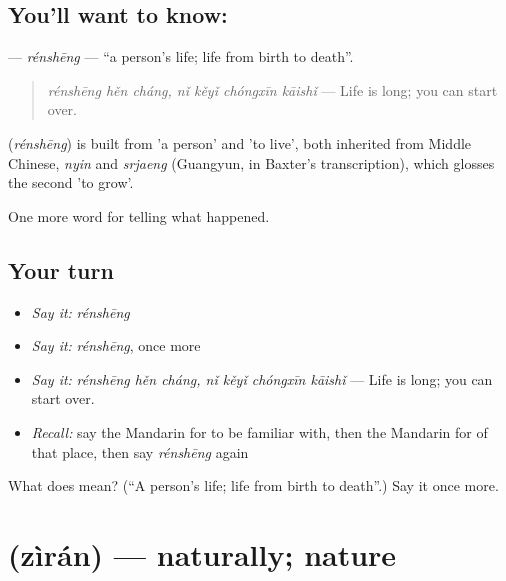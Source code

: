\subsection*{You'll want to know: }
\textbf{} — \emph{rénshēng} — \textquotedblleft{}a person's life; life from birth to death\textquotedblright{}.

\begin{quote}
\emph{rénshēng hěn cháng, nǐ kěyǐ chóngxīn kāishǐ} — Life is long; you can start over.
\end{quote}

\begin{cousinweb}
\textbf{} (\emph{rénshēng}) is built from  'a person' and  'to live', both inherited from Middle Chinese, \emph{nyin} and \emph{srjaeng} (Guangyun, in Baxter's transcription), which glosses the second 'to grow'.
\end{cousinweb}

\begin{grammarlens}[title={What you've built}]
One more word for telling what happened.
\end{grammarlens}

\subsection*{Your turn}
\begin{itemize}
\raggedright
  \item \emph{Say it:} \emph{rénshēng}
  \item \emph{Say it:} \emph{rénshēng}, once more
  \item \emph{Say it:} \emph{rénshēng hěn cháng, nǐ kěyǐ chóngxīn kāishǐ} — Life is long; you can start over.
  \item \emph{Recall:} say the Mandarin for to be familiar with, then the Mandarin for of that place, then say \emph{rénshēng} again
\end{itemize}

\begin{tcolorbox}[breakable,colback=teal!4,colframe=teal!35!black,title={Before you move on}]
What does  mean? (\textquotedblleft{}A person's life; life from birth to death\textquotedblright{}.) Say it once more.
\end{tcolorbox}
\section[\texorpdfstring{\zh{自然} (zìrán)}{自然 (zìrán)}]{ (zìrán) — naturally; nature}

